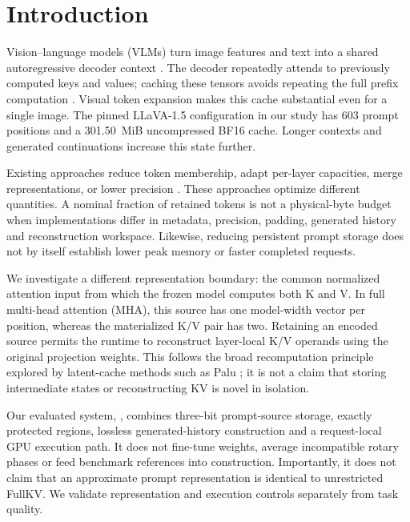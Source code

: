 \section{Introduction}
\label{sec:intro}
Vision--language models (VLMs) turn image features and text into a shared
autoregressive decoder context \citep{liu2023llava,liu2024improved}.
The decoder repeatedly attends to previously computed keys and values;
caching these tensors avoids repeating the full prefix computation
\citep{vaswani2017attention}. Visual token expansion makes this cache
substantial even for a single image. The pinned LLaVA-1.5 configuration in
our study has 603 prompt positions and a 301.50~MiB uncompressed BF16 cache.
Longer contexts and generated continuations increase this state further.

Existing approaches reduce token membership, adapt per-layer capacities,
merge representations, or lower precision
\citep{zhang2023h2o,li2024snapkv,wang2025prefixkv,tu2025vlcache,wan2024lookm,liu2024kivi}.
These approaches optimize different quantities. A nominal fraction of
retained tokens is not a physical-byte budget when implementations differ
in metadata, precision, padding, generated history and reconstruction
workspace. Likewise, reducing persistent prompt storage does not by itself
establish lower peak memory or faster completed requests.

We investigate a different representation boundary: the common normalized
attention input from which the frozen model computes both K and V. In
full multi-head attention (MHA), this source has one model-width vector per
position, whereas the materialized K/V pair has two. Retaining an encoded
source permits the runtime to reconstruct layer-local K/V operands using
the original projection weights. This follows the broad recomputation
principle explored by latent-cache methods such as Palu
\citep{chang2024palu}; it is not a claim that storing intermediate states
or reconstructing KV is novel in isolation.

Our evaluated system, \Evi{}, combines three-bit prompt-source storage,
exactly protected regions, lossless generated-history construction and a
request-local GPU execution path. It does not fine-tune weights, average
incompatible rotary phases or feed benchmark references into construction.
Importantly, it does not claim that an approximate prompt representation
is identical to unrestricted FullKV. We validate representation and execution
controls separately from task quality.

